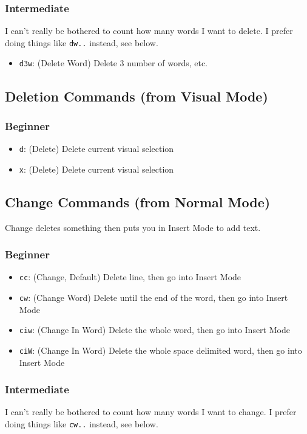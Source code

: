 \documentclass[11pt]{article}
\begin{document}
\subsubsection{Intermediate}
\label{sec:orgde4ccbf}
I can't really be bothered to count how many words I want to delete. I prefer
doing things like \texttt{dw..} instead, see below.
\begin{itemize}
\item \texttt{d3w}: (Delete Word) Delete 3 number of words, etc.
\end{itemize}
\subsection{Deletion Commands (from Visual Mode)}
\label{sec:org105f03a}
\subsubsection{Beginner}
\label{sec:org031e8b1}
\begin{itemize}
\item \texttt{d}: (Delete) Delete current visual selection
\item \texttt{x}: (Delete) Delete current visual selection
\end{itemize}
\subsection{Change Commands (from Normal Mode)}
\label{sec:org610786d}
Change deletes something then puts you in Insert Mode to add text.
\subsubsection{Beginner}
\label{sec:orgb14b967}
\begin{itemize}
\item \texttt{cc}: (Change, Default) Delete line, then go into Insert Mode
\item \texttt{cw}: (Change Word) Delete until the end of the word, then go into Insert Mode
\item \texttt{ciw}: (Change In Word) Delete the whole word, then go into Insert Mode
\item \texttt{ciW}: (Change In Word) Delete the whole space delimited word, then go into Insert Mode
\end{itemize}
\subsubsection{Intermediate}
\label{sec:org599df6d}
I can't really be bothered to count how many words I want to change. I prefer
doing things like \texttt{cw..} instead, see below.
\end{document}
